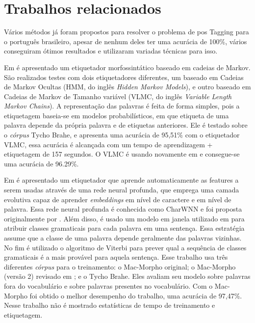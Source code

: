 \chapter{Trabalhos relacionados}\label{trabalhosrelacionados}

Vários métodos já foram propostos para resolver o problema de \ac{pos} Tagging para o português brasileiro, apesar de nenhum deles ter uma acurácia de 100\%, vários conseguiram ótimos resultados e utilizaram variadas técnicas para isso.

Em \cite{kepler2005etiquetador} é apresentado um etiquetador morfossintático baseado em cadeias de Markov. São realizados testes com dois etiquetadores diferentes, um baseado em Cadeias de Markov Ocultas (HMM, do inglês \textit{Hidden Markov Models}), e outro baseado em Cadeias de Markov de Tamanho variável (VLMC, do inglês \textit{Variable Length Markov Chains}). A representação das palavras é feita de forma simples, pois a etiquetagem baseia-se em modelos probabilísticos, em que etiqueta de uma palavra depende da própria palavra e de etiquetas anteriores. Ele é testado sobre o \textit{córpus} Tycho Brahe, e apresenta uma acurácia de 95,51\% com o etiquetador VLMC, essa acurácia é alcançada com um tempo de aprendizagem + etiquetagem de 157 segundos.  O VLMC é usando novamente em \cite{kepler2010variable} e consegue-se uma acurácia de 96.29\%.


Em \cite{dos2014training} é apresentado um etiquetador que aprende automaticamente as features a serem usadas através de uma rede neural profunda, que emprega uma camada evolutiva capaz de aprender \textit{embeddings} em nível de caractere e em nível de palavra. Essa rede neural profunda é conhecida como CharWNN e foi proposta originalmente por . Além disso, é usado um modelo em janela utilizado em \cite{collobert2011natural} para atribuir classes gramaticais para cada palavra em uma sentença. Essa estratégia assume que a classe de uma palavra depende geralmente das palavras vizinhas. No fim é utilizado o algoritmo de Viterbi \cite{viterbi1967error} para prever qual a sequência de classes gramaticais é a mais provável para aquela sentença. Esse trabalho usa três diferentes \textit{córpus} para o treinamento: o Mac-Morpho original; o Mac-Morpho (versão 2) revisado em \cite{fonseca2013mac}; e o Tycho Brahe. Eles avaliam seu modelo sobre palavras fora do vocabulário e sobre palavras presentes no vocabulário. Com o Mac-Morpho foi obtido o melhor desempenho do trabalho, uma acurácia de 97,47\%. Nesse trabalho não é mostrado estatísticas de tempo de treinamento e etiquetagem.

